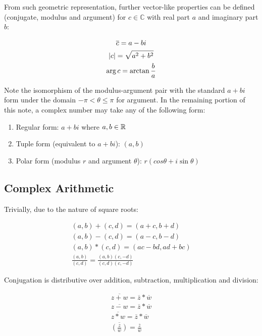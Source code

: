 \documentclass[12pt]{article}
\begin{document}
	From such geometric representation, further vector-like properties can be defined (conjugate, modulus and argument) for $c \in \mathbb{C}$ with real part $a$ and imaginary part $b$:
	
	\begin{gather*}
		\overline{c} = a - bi \\
		\lvert c \rvert = \sqrt{a^2 + b^2} \\
		\arg c = \arctan \frac{b}{a}
	\end{gather*}
	
	Note the isomorphism of the modulus-argument pair with the standard $a + bi$ form under the domain $-\pi < \theta \leq \pi$ for argument. In the remaining portion of this note, a complex number may take any of the following form:
	
	\begin{enumerate}
		\item Regular form: $a + bi$ where $a, b \in \mathbb{R}$
		\item Tuple form (equivalent to $a + bi$): $(a, b)$
		\item Polar form (modulus $r$ and argument $\theta$): $r(cos \theta + i \sin \theta)$
	\end{enumerate}
	
	\subsection{Complex Arithmetic}
	
	Trivially, due to the nature of square roots:
	
	\begin{gather*}
		(a, b) + (c, d) = (a + c, b + d) \\
		(a, b) - (c, d) = (a - c, b - d) \\
		(a, b) * (c, d) = (ac - bd, ad + bc) \\
		\frac{(a, b)}{(c, d)} = \frac{(a, b)(c, -d)}{(c, d)(c, -d)}
	\end{gather*}
	
	Conjugation is distributive over addition, subtraction, multiplication and division:
	
	\begin{gather*}
		\overline{z + w} = \overline{z} * \overline{w} \\
		\overline{z - w} = \overline{z} * \overline{w} \\
		\overline{z * w} = \overline{z} * \overline{w} \\
		\overline{\left(\frac{z}{w}\right)} = \frac{\overline{z}}{\overline{w}}
	\end{gather*}
	
\end{document}
